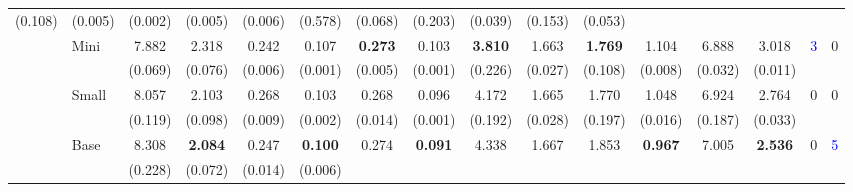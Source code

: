\begin{table}[ht]
{\begin{tabular}{ll|cc|cc|cc|cc|cc|cc||cc}
                      \small{(0.108)} & 
                      \small{(0.005)} & 
                      \small{(0.002)} & 
                      \small{(0.005)} & 
                      \small{(0.006)} & 
                      \small{(0.578)} & 
                      \small{(0.068)} &
                      \small{(0.203)} & 
                      \small{(0.039)} &
                      \small{(0.153)} & 
                      \small{(0.053)} \\
\cline{2-16}
{} & \multirow{2}{*}{Mini} & 7.882 & 2.318 & 0.242 & 0.107 & \textbf{0.273} & 0.103 & \textbf{3.810} & 1.663 & \textbf{1.769} & 1.104 & 6.888 & 3.018 & \multirow{2}{*}{\small{\textcolor{blue}{3}}} & \multirow{2}{*}{\small{0}}\\
                      {} & {} &
                      \small{(0.069)} & 
                      \small{(0.076)} & 
                      \small{(0.006)} & 
                      \small{(0.001)} & 
                      \small{(0.005)} & 
                      \small{(0.001)} & 
                      \small{(0.226)} & 
                      \small{(0.027)} &
                      \small{(0.108)} & 
                      \small{(0.008)} &
                      \small{(0.032)} & 
                      \small{(0.011)} \\
\cline{2-16}
{} & \multirow{2}{*}{Small} & 8.057 & 2.103 & 0.268 & 0.103 & 0.268 & 0.096 & 4.172 & 1.665 & 1.770 & 1.048 & 6.924 & 2.764 & \multirow{2}{*}{\small{0}} & \multirow{2}{*}{\small{0}}\\
                      {} & {} &
                      \small{(0.119)} & 
                      \small{(0.098)} & 
                      \small{(0.009)} & 
                      \small{(0.002)} & 
                      \small{(0.014)} & 
                      \small{(0.001)} & 
                      \small{(0.192)} & 
                      \small{(0.028)} &
                      \small{(0.197)} & 
                      \small{(0.016)} &
                      \small{(0.187)} & 
                      \small{(0.033)} \\
\cline{2-16}
{} & \multirow{2}{*}{Base} & 8.308 & \textbf{2.084} & 0.247 & \textbf{0.100} & 0.274 & \textbf{0.091} & 4.338 & 1.667 & 1.853 & \textbf{0.967} & 7.005 & \textbf{2.536} & \multirow{2}{*}{\small{0}} & \multirow{2}{*}{\small{\textcolor{blue}{5}}} \\
                      {} & {} &
                      \small{(0.228)} & 
                      \small{(0.072)} & 
                      \small{(0.014)} & 
                      \small{(0.006)} & 

\end{tabular}}
\end{table}
